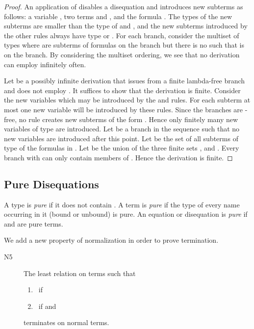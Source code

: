 \begin{proof}
  An application of \TRFFE disables a disequation
   and introduces new subterms
  as follows: a variable , two terms
   and , and the formula .  The types of the new
  subterms are smaller than the type of  and ,
  and the new subterms introduced by the other rules
  always have type  or .
  For each branch,
  consider the multiset of types
   where
   are subterms of formulas on the branch but
  there is no  such that
   is on the branch.
  By considering the multiset ordering, we see that no derivation can
  employ \TRFFE infinitely often.

  Let  be a possibly infinite
  derivation that issues from a finite lambda-free
  branch and does not employ \TRFFE.  It suffices to
  show that the derivation is finite.  
  Consider the new variables  which may be introduced
  by the  and  rules.
  For each subterm  at most one new variable will
  be introduced by these rules.
  Since the branches are -free, no rule creates new subterms of the form .
  Hence only finitely many new variables of type 
  are introduced.
  Let  be a branch in the sequence such that no new
  variables are introduced after this point.  
  Let  be the set of all subterms of type  of the formulas in .
  Let  be the union of the three finite sets 
  , 
  and .
  Every branch  with 
  can only contain members of .  Hence the derivation is finite.
\end{proof}

\subsection{Pure Disequations}

A type is \emph{pure} if it does not contain .  A
term is \emph{pure} if the type of every name occurring
in it (bound or unbound) is pure.  An equation  or
disequation  is \emph{pure} if  and  are
pure terms.

We add a new property of normalization in order to prove termination.
\begin{description}
\item[{N5}] 
  The least relation  on terms such that
  \begin{enumerate}[(1)]
  \item  \ if 
    
  \item  \ if  and 
  \end{enumerate}
  terminates on normal terms.
\end{description}

